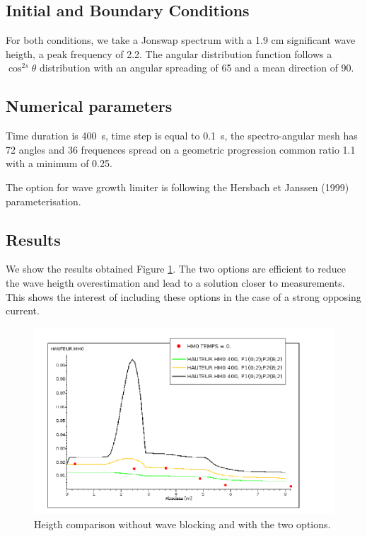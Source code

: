 %
%
\subsection{Initial and Boundary Conditions}
%
For both conditions, we take a Jonswap spectrum with a 1.9 cm significant wave heigth, a peak frequency of 2.2. The angular distribution function follows a $\cos^{2s} \theta$ distribution with an angular spreading of 65 and a mean direction of 90.
%
%
\subsection{Numerical parameters}
%
Time duration is 400~s, time step is equal to 0.1~s, the spectro-angular mesh has 72 angles and 36 frequences spread on a geometric progression common ratio 1.1 with a minimum of 0.25.

The option for wave growth limiter is following the Hersbach et Janssen (1999) parameterisation.

%
%
\subsection{Results}
%
We show the results obtained Figure \ref{reswaveblocking}. The two options are efficient to reduce the wave heigth overestimation and lead to a solution closer to measurements. This shows the interest of including these options in the case of a strong opposing current.

\begin{figure} [!h]
\centering
\includegraphics[scale = 0.4]{hauteur.png}
 \caption{Heigth comparison without wave blocking and with the two options.}
\label{reswaveblocking}
\end{figure}




